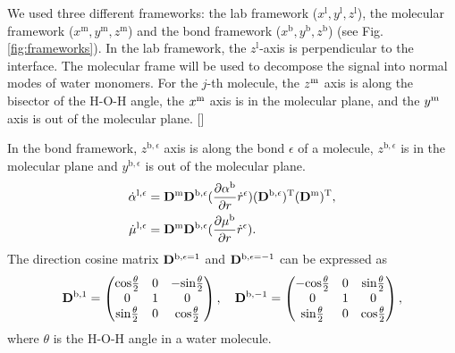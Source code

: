 %
We used three different frameworks: the lab framework ($x^{\text{l}},y^{\text{l}},z^{\text{l}}$), the molecular framework 
($x^{\text{m}},y^{\text{m}},z^{\text{m}}$) and the bond framework ($x^{\text{b}},y^{\text{b}},z^{\text{b}}$) (see Fig.\thinspace\ref{fig:frameworks}).
In the lab framework, the $z^{\text{l}}$-axis is perpendicular to the interface. 
The molecular frame will be used to decompose the signal into normal modes of water monomers. 
For the $j$-th molecule, the $z^{\text m}$ axis is along the bisector of the H-O-H angle, the $x^{\text m}$ axis is in the molecular plane, 
and the $y^{\text m}$ axis is out of the molecular plane. [\cite{Khatib2017}] 

In the bond framework, $z^{\text{b},\epsilon}$ axis is along the bond $\epsilon$ of a molecule, $z^{\text{b},\epsilon}$
is in the molecular plane and $y^{\text{b},\epsilon}$ is out of the molecular plane.
\begin{align}
  \dot{\alpha}^{\text{l},\epsilon} &= {\bf{D}}^{\text{m}}{\bf{D}}^{\text{b},\epsilon}(\frac{\partial{\alpha}^{\text{b}}}{\partial r}\dot
    r^{\epsilon})({\bf D}^{\text{b},\epsilon})^{\text{T}}({\bf D}^{\text{m}})^{\text{T}}, \\ 
    \dot\mu^{\text{l},\epsilon} &= {\bf{D}}^{\text{m}}{\bf{D}}^{\text{b},\epsilon}(\frac{\partial \mu^{\text{b}}}{\partial r}\dot r^{\epsilon}).
    \label{eq:dot_mu-alpha}
 \end{align}
The direction cosine matrix ${\bf{D}}^{\text{b},\epsilon=1}$ and ${\bf{D}}^{\text{b},\epsilon=-1}$ can be expressed as 
\begin{equation}
    {\bf{D}}^{\text{b},1}=\left(
                \begin{matrix}
                    \text{cos}\frac{\theta}{2} &  0  & -\text{sin}\frac{\theta}{2}\\
                    0 & 1 & 0\\
                    \text{sin}\frac{\theta}{2} & 0 & \text{cos}\frac{\theta}{2}
\end{matrix}
\right),\quad
    {\bf{D}}^{\text{b},-1}=\left(
         \begin{matrix}
             -\text{cos}\frac{\theta}{2} & 0 & \text{sin}\frac{\theta}{2}\\
             0 & 1 & 0\\
             \text{sin}\frac{\theta}{2} & 0  & \text{cos}\frac{\theta}{2}
\end{matrix}
\right),
\label{eq:D_b}
\end{equation}
where $\theta$ is the H-O-H angle in a water molecule.
